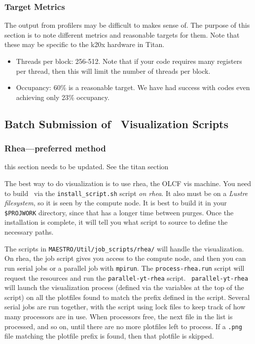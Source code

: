 \subsubsection{Target Metrics}
The output from profilers may be difficult to makes sense of.  The purpose of
this section is to note different metrics and reasonable targets for them.
Note that these may be specific to the k20x hardware in Titan.
\begin{itemize}
   \item Threads per block: 256-512.  Note that if your code requires many
      registers per thread, then this will limit the number of threads per block.
   \item Occupancy: 60\% is a reasonable target.  We have had success with codes
      even achieving only 23\% occupancy.  
\end{itemize}

\subsection{Batch Submission of \yt\ Visualization Scripts}

\subsubsection{Rhea---preferred method}

{\color{red} this section needs to be updated.  See the titan section}

The best way to do visualization is to use rhea, the OLCF vis machine.
You need to build \yt\ via the {\tt install\_script.sh} script {\em on
rhea}.  It also must be on a {\em Lustre filesystem}, so it is seen by
the compute node.  It is best to build it in your {\tt \$PROJWORK} directory,
since that has a longer time between purges.  Once the installation is
complete, it will tell you what script to source to define the
necessary paths.

The scripts in {\tt MAESTRO/Util/job\_scripts/rhea/} will handle the
visualization.  On rhea, the job script gives you access to the
compute node, and then you can run serial jobs or a parallel job with
{\tt mpirun}.  The {\tt process-rhea.run} script will request the
resources and run the {\tt parallel-yt-rhea} script.  {\tt
parallel-yt-rhea} will launch the visualization process (defined
via the variables at the top of the script) on all the plotfiles
found to match the prefix defined in the script.  Several serial
jobs are run together, with the script using lock files to keep track
of how many processors are in use.  When processors free, the next
file in the list is processed, and so on, until there are no more
plotfiles left to process.  If a {\tt .png} file matching the
plotfile prefix is found, then that plotfile is skipped.

